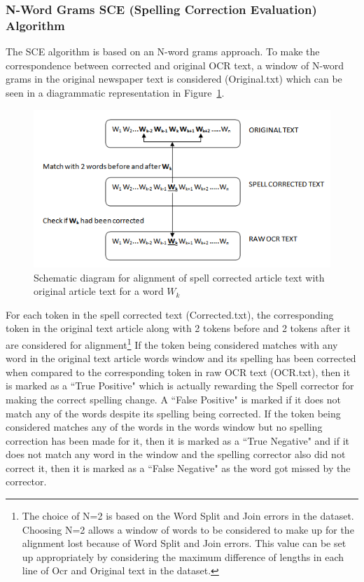 \documentclass[12pt]{article}
\begin{document}
\subsubsection{N-Word Grams SCE (Spelling Correction Evaluation) Algorithm}

The SCE algorithm is based on an N-word grams approach. To make the correspondence between corrected and original OCR text, a window of N-word grams in the original newspaper text is considered (Original.txt) which can be seen in a diagrammatic representation in Figure~\ref{figure:2}.

\begin{figure} [!htb]
\centering
\includegraphics[scale=0.8]{ngram}
\caption{Schematic diagram for alignment of spell corrected article text with original article text for a word $W_{k}$}
\label{figure:2}
\end{figure}

For each token in the spell corrected text (Corrected.txt), the corresponding token in the original text article along with 2 tokens before and 2 tokens after it are considered for alignment\footnote{ The choice of N=2 is based on the Word Split and Join errors in the dataset. Choosing N=2 allows a window of words to be considered to make up for the alignment lost because of Word Split and Join errors. This value can be set up appropriately by considering the maximum difference of lengths in each line of Ocr and Original text in the dataset.}
If the token being considered matches with any word in the original text article words window and its spelling has been corrected when compared to the corresponding token in raw OCR text (OCR.txt), then it is marked as a ``True Positive" which is actually rewarding the Spell corrector for making the correct spelling change. A ``False Positive" is marked if it does not match any of the words despite its spelling being corrected. If the token being considered matches any of the words in the words window but no spelling correction has been made for it, then it is marked as a ``True Negative" and if it does not match any word in the window and the spelling corrector also did not correct it, then it is marked as a ``False Negative" as the word got missed by the corrector. 
\end{document}
